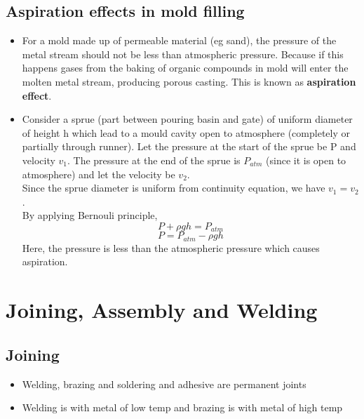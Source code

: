 \documentclass{article}
\begin{document}
	\subsection{Aspiration effects in mold filling}
	\begin{itemize}

		\item For a mold made up of permeable material (eg sand), the pressure of the metal stream should not be less than atmospheric pressure. Because if this happens gases from the baking of organic compounds in mold will enter the molten metal stream, producing porous casting. This is known as \textbf{aspiration effect}.
		\item Consider a sprue (part between pouring basin and gate) of uniform diameter of height h which lead to a mould cavity open to atmosphere (completely or partially through runner). Let the pressure at the start of the sprue be P and velocity $v_1$. The pressure at the end of the sprue is $P_{atm}$ (since it is open to atmosphere) and let the velocity be $v_2$.\\
		Since the sprue diameter is uniform from continuity equation, we have $v_1 = v_2$.\\
		By applying Bernouli principle,
		\[P + \rho g h = P_{atm}\]
		\[P = P_{atm} - \rho g h\]
		Here, the pressure is less than the atmospheric pressure which causes aspiration. 


	\end{itemize}


\section{Joining, Assembly and Welding}

	\subsection{Joining}
		\begin{itemize}
			\item Welding, brazing and soldering and adhesive are permanent joints
			\item Welding is with metal of low temp and brazing is with metal of high temp
		\end{itemize}
\end{document}
